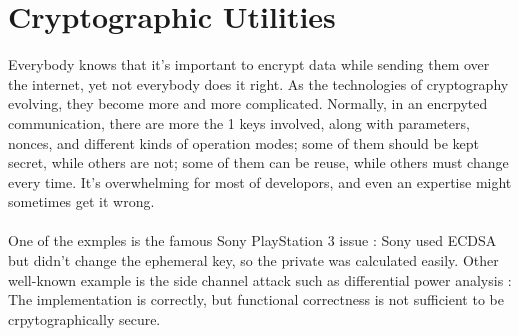 \documentclass[10pt, a4paper]{article}
\begin{document}



\section{Cryptographic Utilities}
Everybody knows that it's important to encrypt data while sending them over the internet,
yet not everybody does it right.
As the technologies of cryptography evolving,
they become more and more complicated.
Normally, in an encrpyted communication, there are more the 1 keys involved,
along with parameters, nonces, and different kinds of operation modes;
some of them should be kept secret, while others are not;
some of them can be reuse, while others must change every time.
It's overwhelming for most of developors, and even an expertise might sometimes get it wrong.
\\\\
One of the exmples is the famous Sony PlayStation 3 issue \cite{PS3_Jailbreak}:
Sony used ECDSA \cite{ECDSA} but didn't change the ephemeral key, so the
private was calculated easily.
Other well-known example is the
side channel attack such as differential power analysis \cite{differential}:
The implementation is correctly, but functional correctness is not sufficient to
be crpytographically secure.
\\\\
\end{document}
